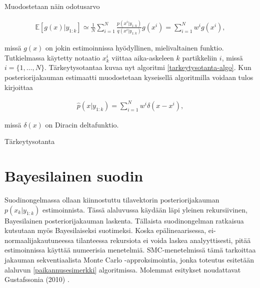 \documentclass[
  12pt,
  a4paper, twoside]{book}
\begin{document}
Muodostetaan näin odotusarvo

\begin{align}
\mathbb{E}[g(x)|y_{1:k}]\simeq\frac{1}{N}\sum_{i=1}^N\frac{p(x^i|y_{1:k})}{q(x^i|y_{1:k})}g(x^i)=\sum_{i=1}^Nw^ig(x^i),
\end{align}

\noindent missä \(g(x)\) on jokin estimoinnissa hyödyllinen, mielivaltainen funktio. Tutkielmassa käytetty notaatio \(x_k^i\) viittaa aika-askeleen \(k\) partikkeliin \(i\), missä \(i=\{1,\ldots,N\}\). Tärkeytysotantaa kuvaa nyt algoritmi \ref{tarkeytysotanta-algo}. Kun posteriorijakauman estimaatti muodostetaan kyseisellä algoritmilla voidaan tulos kirjoittaa

\begin{align}
\hat{p}(x|y_{1:k})=\sum_{i=1}^{N}w^i \delta(x-x^i),
\end{align}

\noindent missä \(\delta(x)\) on Diracin deltafunktio.

\begin{algorithm}[H]
\label{tarkeytysotanta-algo}
\DontPrintSemicolon
{}  
\caption{Tärkeytysotanta}
\end{algorithm}

\section{Bayesilainen suodin} \label{bayesilainen-suodin}

Suodinongelmassa ollaan kiinnostuttu tilavektorin posteriorijakauman \(p(x_k|y_{1:k})\) estimoinnista. Tässä alaluvussa käydään läpi yleinen rekursiivinen, Bayesilainen posteriorijakauman laskenta. Tällaista suodinongelman ratkaisua kutsutaan myös Bayesilaiseksi suotimeksi. Koska epälineaarisessa, ei-normaalijakautuneessa tilanteessa rekursiota ei voida laskea analyyttisesti, pitää estimoinnissa käyttää numeerisia menetelmiä. SMC-menetelmissä tämä tarkoittaa jakauman sekventiaalista Monte Carlo -approksimointia, jonka toteutus esitetään alaluvun \ref{paikannusesimerkki} algoritmissa. Molemmat esitykset noudattavat Gustafssonia (2010) \citep{gustafsson-2010}.
\end{document}
